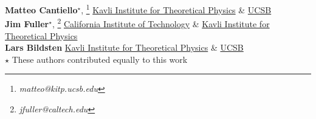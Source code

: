 \textbf{Matteo Cantiello}$^\star$, \footnote{\textit{matteo@kitp.ucsb.edu}} \href{https://www.authorea.com/inst/7192}{Kavli Institute for Theoretical Physics} \& \href{https://www.authorea.com/inst/7191}{UCSB} \\
\textbf{Jim Fuller}$^\star$, \footnote{\textit{jfuller@caltech.edu}} \href{https://www.authorea.com/inst/943}{California Institute of Technology} \& \href{https://www.authorea.com/inst/7192}{Kavli Institute for Theoretical Physics}\\
\textbf{Lars Bildsten} \href{https://www.authorea.com/inst/7192}{Kavli Institute for Theoretical Physics} \& \href{https://www.authorea.com/inst/7191}{UCSB}\\

$\star$ These authors contributed equally to this work

